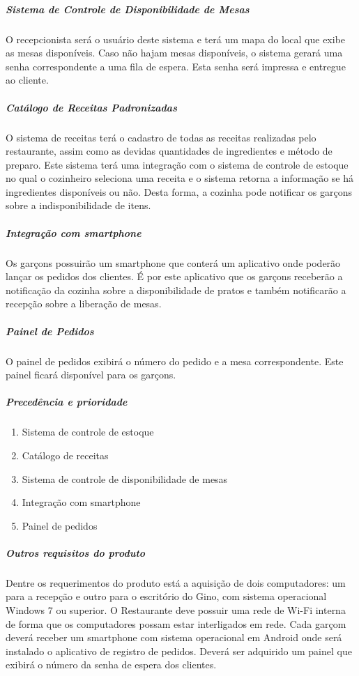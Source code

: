 \subparagraph{Sistema de Controle de Disponibilidade de Mesas}

O recepcionista será o usuário deste sistema e terá um mapa do local que exibe as mesas disponíveis. Caso não hajam mesas disponíveis, o sistema gerará uma senha correspondente a uma fila de espera. Esta senha será impressa e entregue ao cliente.

\subparagraph{Catálogo de Receitas Padronizadas}


O sistema de receitas terá o cadastro de todas as receitas realizadas pelo restaurante, assim como as devidas quantidades de ingredientes e método de preparo. Este sistema terá uma integração com o sistema de controle de estoque no qual o cozinheiro seleciona uma receita e o sistema retorna a informação se há ingredientes disponíveis ou não. Desta forma, a cozinha pode notificar os garçons sobre a indisponibilidade de itens.

\subparagraph{Integração com smartphone}

Os garçons possuirão um smartphone que conterá um aplicativo onde poderão lançar os pedidos dos clientes. É por este aplicativo que os garçons receberão a notificação da cozinha sobre a disponibilidade de pratos e também notificarão a recepção sobre a liberação de mesas.


\subparagraph{Painel de Pedidos}


O painel de pedidos exibirá o número do pedido e a mesa correspondente. Este painel ficará disponível para os garçons.


\subparagraph{Precedência e prioridade}
\begin{enumerate}
  \item Sistema de controle de estoque
  \item Catálogo de receitas
  \item Sistema de controle de disponibilidade de mesas
  \item Integração com smartphone
  \item Painel de pedidos
\end{enumerate}

\subparagraph{Outros requisitos do produto}

Dentre os requerimentos do produto está a aquisição de dois computadores: um para a recepção e outro para o escritório do Gino, com sistema operacional Windows 7 ou superior. O Restaurante deve possuir uma rede de Wi-Fi interna de forma que os computadores possam estar interligados em rede. Cada garçom deverá receber um smartphone com sistema operacional em Android onde será instalado o aplicativo de registro de pedidos. Deverá ser adquirido um painel que exibirá o número da senha de espera dos clientes.

